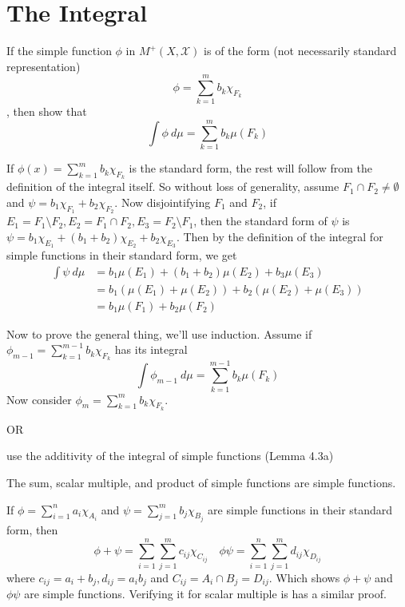 
\chapter{The Integral}

\begin{exercise}[A]
  If the simple function $\phi$ in $M^{+}(X, \mathcal{X})$ is of the form (not necessarily standard representation) $$\phi  = \sum_{k = 1}^{m} b_k \chi_{F_k}$$, then show that $$\int \phi \ d \mu = \sum_{k = 1}^{m}  b_k \mu(F_k)$$
\end{exercise}
\begin{solution}
  If $\phi(x) = \sum_{k = 1}^{m} b_k \chi_{F_k}$ is the standard form, the rest will follow from the definition of the integral itself. So without loss of generality, assume $F_1 \cap F_2 \neq \emptyset$ and $\psi = b_1 \chi_{F_1} + b_{2} \chi_{F_2}$. Now disjointifying $F_1$ and $F_2$, if $E_1 = F_1 \setminus F_2, E_2 = F_1 \cap F_2, E_3 = F_2 \setminus F_1$, then the standard form of $\psi$ is $\psi = b_1 \chi_{E_1} + (b_1+b_2) \chi_{E_2} + b_2 \chi_{E_3}$. Then by the definition of the integral for simple functions in their standard form, we get \begin{align*}
    \int \psi \ d \mu &=  b_1 \mu(E_1) + (b_1 + b_2) \mu(E_2) + b_3 \mu(E_3) \\ 
                      &=  b_1 (\mu(E_1) + \mu(E_2)) + b_2 (\mu(E_2) + \mu(E_3)) \\
                      &=  b_1 \mu(F_1) + b_2 \mu(F_2)
  \end{align*}

  Now to prove the general thing, we'll use induction. Assume if $\phi_{m-1} = \sum_{k = 1}^{m-1} b_k \chi_{F_k}$ has its integral $$\int \phi_{m-1} \ d \mu = \sum_{k = 1}^{m - 1} b_k \mu(F_k)$$
  Now consider $\phi_{m} = \sum_{k = 1}^{m} b_k \chi_{F_k}$.

  OR

  use the additivity of the integral of simple functions (Lemma 4.3a)
\end{solution}

\begin{exercise}[B]
  The sum, scalar multiple, and product of simple functions are simple functions.
\end{exercise}
\begin{solution}
    If $\phi = \sum_{i = 1}^{n} a_i \chi_{A_i}$ and $\psi = \sum_{j = 1}^{m} b_j \chi_{B_j}$ are simple functions in their standard form, then $$\phi + \psi = \sum_{i = 1}^{n} \sum_{j = 1}^{m} c_{ij} \chi_{C_{ij}} \quad \phi \psi = \sum_{i = 1}^{n} \sum_{j = 1}^{m} d_{ij} \chi_{D_{ij}}$$ where $c_{ij} = a_i + b_j, d_{ij} = a_i b_j$ and $C_{ij} = A_i \cap B_j = D_{ij}$. Which shows $\phi + \psi$ and $\phi \psi$ are simple functions. 
    Verifying it for scalar multiple is has a similar proof.
\end{solution}

